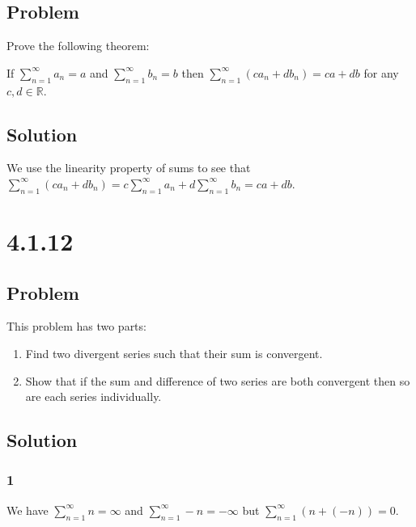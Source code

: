 \documentclass[12pt]{article}
\newcommand{\R}    [0]{\mathbb{R}                   }
\begin{document}
\subsection*{Problem}
Prove the following theorem:

If $\sum_{n = 1}^\infty a_n = a$ and $\sum_{n = 1}^\infty b_n = b$ then $\sum_{n = 1}^\infty (c a_n + d b_n) = ca + db$ for any $c, d \in \R$.

\subsection*{Solution}
We use the linearity property of sums to see that $\sum_{n=1}^\infty (c a_n + d b_n) = c \sum_{n=1}^\infty a_n + d \sum_{n=1}^\infty b_n = ca + db$.



\section*{4.1.12}

\subsection*{Problem}
This problem has two parts:
\begin{enumerate}
    \item Find two divergent series such that their sum is convergent.
    \item Show that if the sum and difference of two series are both convergent then so are each series individually.
\end{enumerate}

\subsection*{Solution}

\subsubsection*{1}
We have $\sum_{n=1}^\infty n = \infty$ and $\sum_{n=1}^\infty -n = -\infty$ but $\sum_{n=1}^\infty (n + (-n)) = 0$.
\end{document}
